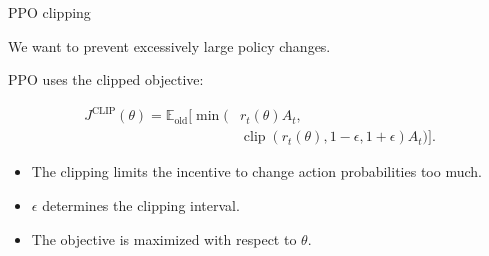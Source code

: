 \documentclass{beamer}
\begin{document}
\begin{frame}{PPO clipping}
	\begin{flushleft}
		
		We want to prevent excessively large policy changes.
		
		PPO uses the clipped objective:
		
		\[
		\boxed{
			\begin{aligned}
				J^{\mathrm{CLIP}}(\theta)
				=
				\mathbb{E}_{\mathrm{old}}
				\Big[
				\min\big(&r_t(\theta)A_t,\\
				&\operatorname{clip}
				(r_t(\theta),1-\epsilon,1+\epsilon)A_t
				\big)
				\Big].
			\end{aligned}
		}
		\]
		
		\begin{itemize}
			\item The clipping limits the incentive to change
			action probabilities too much.
			\item $\epsilon$ determines the clipping interval.
			\item The objective is maximized with respect to $\theta$.
		\end{itemize}
		
	\end{flushleft}
\end{frame}



\myqrframe
\end{document}
